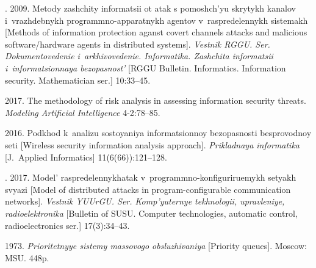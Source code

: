  \begin{multicols}{2}

\renewcommand{\bibname}{\protect\rmfamily References}

{\small\frenchspacing
 {%
 \begin{thebibliography}{9}
  
  . 2009. Metody 
zashchity informatsii ot atak s pomoshch'yu skrytykh kanalov i~vrazhdebnykh 
programmno-apparatnykh agentov v~raspredelennykh sistemakh [Methods of 
information protection aganst covert channels attacks and 
malicious software/hardware agents in distributed systems]. 
\textit{Vestnik RGGU. Ser. Dokumentovedenie i~arkhivovedenie. Informatika. 
Zashchita informatsii i~informatsionnaya bezopasnost'} [RGGU Bulletin. Informatics. Information 
security. Mathematician ser.] 10:33--45. 

2017. The methodology of risk analysis in assessing information security threats. 
\textit{Modeling Artificial Intelligence} 4-2:78--85.

  
   2016. Podkhod k~analizu so\-sto\-yaniya informatsionnoy 
bezopasnosti besprovodnoy seti [Wireless security information analysis approach]. 
\textit{Prikladnaya informatika} [J.~Applied Informatics] 11(6(66)):121--128.

  . 2017. Model' raspredelennykhatak 
v~programmno-konfiguriruemykh setyakh svyazi [Model of distributed attacks in 
program-configurable communication networks]. \textit{Vestnik YUUrGU. Ser. 
Komp'yuternye tekhnologii, upravleniye, radioelektronika} [Bulletin of SUSU. 
Computer technologies, automatic control, radioelectronics ser.] 17(3):34--43.

   1973. \textit{Prioritetnyye sistemy massovogo obsluzhivaniya} 
[Priority queues]. Moscow: MSU. 448p.
\end{thebibliography}

 }
 }

\end{multicols}

